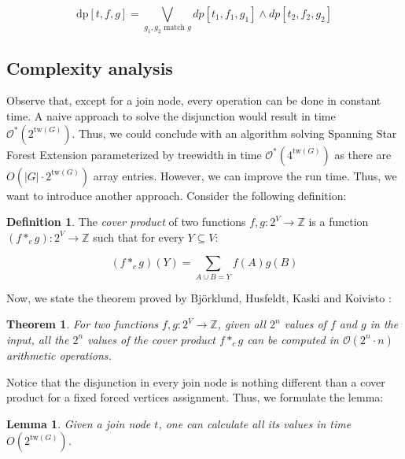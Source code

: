 \documentclass[en]{pracamgr}
\newtheorem{theorem}{Theorem}
\newtheorem{lemma}{Lemma}
\theoremstyle{definition}
\newtheorem{definition}{Definition}
\newcommand{\ssfep}{{\sc Spanning Star Forest Extension}}
\newcommand{\dpt}[1]{\textrm{dp}[#1]}
\newcommand{\tw}{\textrm{tw}}
\begin{document}
\begin{equation*}
	\dpt{t,f,g} =
		\bigvee\limits_{g_1,g_2 \text{ match $g$}} dp[t_1,f_1,g_1] \land dp[t_2,f_2,g_2]
\end{equation*}

\subsection{Complexity analysis}

Observe that, except for a join node, every operation can be done in constant time. A naive approach to solve the disjunction would result in time $\mathcal{O}^*(2^{\tw(G)})$. Thus, we could conclude with an algorithm solving \ssfep{} parameterized by treewidth in time $\mathcal{O}^*(4^{\tw(G)})$ as there are $O(|G| \cdot 2^{\tw(G)})$ array entries. However, we can improve the run time. Thus, we want to introduce another approach. Consider the following definition:

\begin{definition}
	The \textit{cover product} of two functions $f,g:2^V \rightarrow \mathbb{Z}$ is a function $(f *_c g):2^V \rightarrow \mathbb{Z}$ such that for every $Y \subseteq V$:
	
	\begin{equation*}
		(f *_c g)(Y) = \sum\limits_{ A \cup B = Y} f(A)g(B)
	\end{equation*}
\end{definition}

Now, we state the theorem proved by Björklund, Husfeldt, Kaski and Koivisto \cite{Cover product}:

\begin{theorem}\label{cproduct}
	For two functions $f,g:2^V \rightarrow \mathbb{Z}$, given all $2^n$ values of $f$ and $g$ in the input, all the $2^n$ values of the cover product $f*_cg$ can be computed in $\mathcal{O}(2^n\cdot n)$ arithmetic operations.
\end{theorem}

Notice that the disjunction in every join node is nothing different than a cover product for a fixed forced vertices assignment. Thus, we formulate the lemma:

\begin{lemma}\label{join lemma}
	Given a join node $t$, one can calculate all its values in time $O(2^{\tw(G)})$.
\end{lemma}
\end{document}
